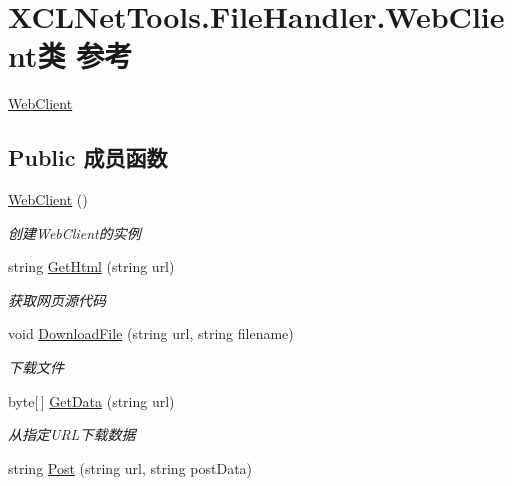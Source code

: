 \hypertarget{class_x_c_l_net_tools_1_1_file_handler_1_1_web_client}{}\section{X\+C\+L\+Net\+Tools.\+File\+Handler.\+Web\+Client类 参考}
\label{class_x_c_l_net_tools_1_1_file_handler_1_1_web_client}


\hyperlink{class_x_c_l_net_tools_1_1_file_handler_1_1_web_client}{Web\+Client}  


\subsection*{Public 成员函数}
\begin{DoxyCompactItemize}
\item 
\hyperlink{class_x_c_l_net_tools_1_1_file_handler_1_1_web_client_a8f3cbaf1baf5d142caab2f6c9cc04a7f}{Web\+Client} ()
\begin{DoxyCompactList}\small\item\em 创建\+Web\+Client的实例 \end{DoxyCompactList}\item 
string \hyperlink{class_x_c_l_net_tools_1_1_file_handler_1_1_web_client_a504910f5e28a6fa620853f069d3c756b}{Get\+Html} (string url)
\begin{DoxyCompactList}\small\item\em 获取网页源代码 \end{DoxyCompactList}\item 
void \hyperlink{class_x_c_l_net_tools_1_1_file_handler_1_1_web_client_ace80aaf94d3e0c6eceb3ad182b8de947}{Download\+File} (string url, string filename)
\begin{DoxyCompactList}\small\item\em 下载文件 \end{DoxyCompactList}\item 
byte\mbox{[}$\,$\mbox{]} \hyperlink{class_x_c_l_net_tools_1_1_file_handler_1_1_web_client_a7208770077f210c3dd7bee2b34f0a4eb}{Get\+Data} (string url)
\begin{DoxyCompactList}\small\item\em 从指定\+U\+R\+L下载数据 \end{DoxyCompactList}\item 
string \hyperlink{class_x_c_l_net_tools_1_1_file_handler_1_1_web_client_ab2497ff9ed5a5b867362b7bc0b38edb1}{Post} (string url, string post\+Data)

\end{DoxyCompactItemize}
